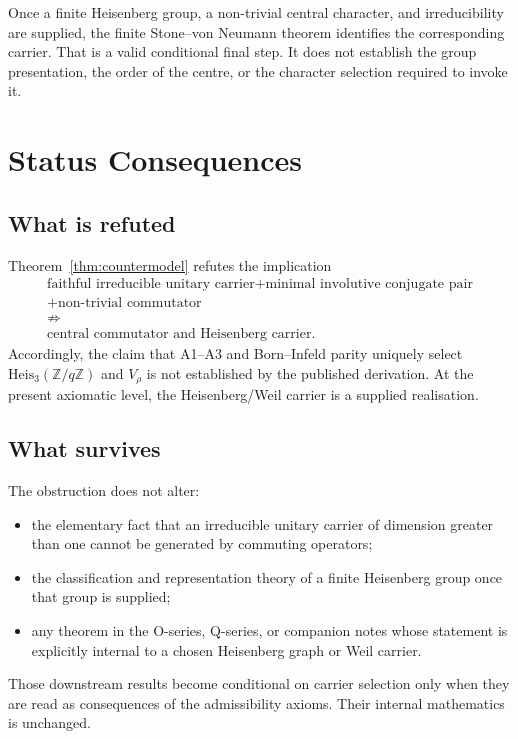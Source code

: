 \documentclass[11pt,a4paper]{article}
\newcommand{\Heis}{\mathrm{Heis}_3}
\begin{document}
Once a finite Heisenberg group, a non-trivial central character, and irreducibility are supplied, the finite
Stone--von Neumann theorem identifies the corresponding carrier.
That is a valid conditional final step.
It does not establish the group presentation, the order of the centre, or the character selection required
to invoke it.

\section{Status Consequences}
\label{sec:status}

\subsection{What is refuted}

Theorem~\ref{thm:countermodel} refutes the implication
\[
\begin{gathered}
\text{faithful irreducible unitary carrier}
+\text{minimal involutive conjugate pair}\\
\text{}+\text{non-trivial commutator}\\
\not\Longrightarrow\\
\text{central commutator and Heisenberg carrier}.
\end{gathered}
\]
Accordingly, the claim that A1--A3 and Born--Infeld parity uniquely select
\(\Heis(\mathbb{Z}/q\mathbb{Z})\) and \(V_\rho\) is not established by the published derivation.
At the present axiomatic level, the Heisenberg/Weil carrier is a supplied realisation.

\subsection{What survives}

The obstruction does not alter:
\begin{itemize}
  \item the elementary fact that an irreducible unitary carrier of dimension greater than one cannot be
  generated by commuting operators;
  \item the classification and representation theory of a finite Heisenberg group once that group is
  supplied;
  \item any theorem in the O-series, Q-series, or companion notes whose statement is explicitly internal to
  a chosen Heisenberg graph or Weil carrier.
\end{itemize}

Those downstream results become conditional on carrier selection only when they are read as consequences of
the admissibility axioms.
Their internal mathematics is unchanged.
\end{document}
